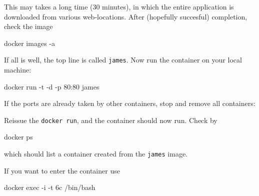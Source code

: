 \documentclass[
]{book}
\newenvironment{Shaded}{\begin{snugshade}}{\end{snugshade}}
\newcommand{\AttributeTok}[1]{\textcolor[rgb]{0.77,0.63,0.00}{#1}}
\newcommand{\ExtensionTok}[1]{#1}
\newcommand{\NormalTok}[1]{#1}
\newcommand{\VariableTok}[1]{\textcolor[rgb]{0.00,0.00,0.00}{#1}}
\begin{document}
This may takes a long time (30 minutes), in which the entire application is downloaded from various web-locations. After (hopefully succesful) completion, check the image

\begin{Shaded}
\begin{Highlighting}[]
\ExtensionTok{docker}\NormalTok{ images }\AttributeTok{{-}a}
\end{Highlighting}
\end{Shaded}

If all is well, the top line is called \texttt{james}. Now run the container on your local machine:

\begin{Shaded}
\begin{Highlighting}[]
\ExtensionTok{docker}\NormalTok{ run }\AttributeTok{{-}t} \AttributeTok{{-}d} \AttributeTok{{-}p}\NormalTok{ 80:80 james}
\end{Highlighting}
\end{Shaded}

If the ports are already taken by other containers, stop and remove all containers:

\begin{Shaded}
\end{Shaded}

Reissue the \texttt{docker\ run}, and the container should now run. Check by

\begin{Shaded}
\begin{Highlighting}[]
\ExtensionTok{docker}\NormalTok{ ps}
\end{Highlighting}
\end{Shaded}

which should list a container created from the \texttt{james} image.

If you want to enter the container use

\begin{Shaded}
\begin{Highlighting}[]
\ExtensionTok{docker}\NormalTok{ exec }\AttributeTok{{-}i} \AttributeTok{{-}t}\NormalTok{ 6c /bin/bash}
\end{Highlighting}
\end{Shaded}
\end{document}
